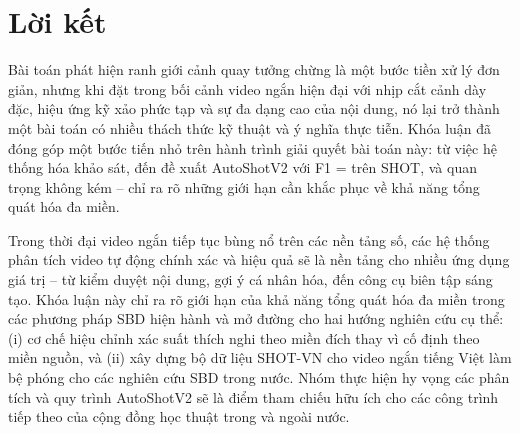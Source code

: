 \section{Lời kết}

Bài toán phát hiện ranh giới cảnh quay tưởng chừng là một bước tiền xử lý đơn giản, nhưng khi đặt trong bối cảnh video ngắn hiện đại với nhịp cắt cảnh dày đặc, hiệu ứng kỹ xảo phức tạp và sự đa dạng cao của nội dung, nó lại trở thành một bài toán có nhiều thách thức kỹ thuật và ý nghĩa thực tiễn. Khóa luận đã đóng góp một bước tiến nhỏ trên hành trình giải quyết bài toán này: từ việc hệ thống hóa khảo sát, đến đề xuất AutoShotV2 với F1 = \ASVTwoShotFOne{} trên SHOT, và quan trọng không kém -- chỉ ra rõ những giới hạn cần khắc phục về khả năng tổng quát hóa đa miền.

Trong thời đại video ngắn tiếp tục bùng nổ trên các nền tảng số, các hệ thống phân tích video tự động chính xác và hiệu quả sẽ là nền tảng cho nhiều ứng dụng giá trị -- từ kiểm duyệt nội dung, gợi ý cá nhân hóa, đến công cụ biên tập sáng tạo. Khóa luận này chỉ ra rõ giới hạn của khả năng tổng quát hóa đa miền trong các phương pháp SBD hiện hành và mở đường cho hai hướng nghiên cứu cụ thể: (i) cơ chế hiệu chỉnh xác suất thích nghi theo miền đích thay vì cố định theo miền nguồn, và (ii) xây dựng bộ dữ liệu SHOT-VN cho video ngắn tiếng Việt làm bệ phóng cho các nghiên cứu SBD trong nước. Nhóm thực hiện hy vọng các phân tích và quy trình AutoShotV2 sẽ là điểm tham chiếu hữu ích cho các công trình tiếp theo của cộng đồng học thuật trong và ngoài nước.
